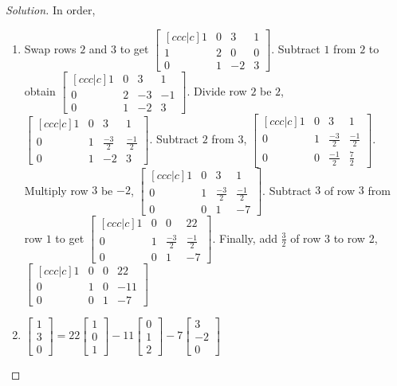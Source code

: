 \documentclass[oneside]{book}
\theoremstyle{definition}
\begin{document}
\begin{proof}[Solution]
In order,
\begin{enumerate}
\item Swap rows $2$ and $3$ to get $\begin{bmatrix}[ccc|c] 1 & 0 & 3 & 1 \\ 1 & 2 & 0 & 0 \\ 0 & 1 & -2 & 3 \end{bmatrix}$. Subtract $1$ from $2$ to obtain $\begin{bmatrix}[ccc|c] 1 & 0 & 3 & 1 \\ 0 & 2 & -3 & -1 \\ 0 & 1 & -2 & 3 \end{bmatrix}$. Divide row $2$ be $2$, $\begin{bmatrix}[ccc|c] 1& 0 & 3 & 1 \\ 0 & 1 & \frac{-3}{2} & \frac{-1}{2} \\ 0 & 1 & -2 & 3\end{bmatrix}$. Subtract $2$ from $3$, $\begin{bmatrix}[ccc|c] 1 & 0 & 3 & 1 \\ 0 & 1 & \frac{-3}{2} & \frac{-1}{2} \\ 0 & 0 & \frac{-1}{2} & \frac{7}{2} \end{bmatrix}$. Multiply row $3$ be $-2$, $\begin{bmatrix}[ccc|c] 1 & 0 & 3 & 1 \\ 0 & 1 & \frac{-3}{2} & \frac{-1}{2} \\ 0 & 0 & 1 & -7 \end{bmatrix}$. Subtract $3$ of row $3$ from row $1$ to get $\begin{bmatrix}[ccc|c] 1 & 0 & 0 & 22 \\ 0 & 1 & \frac{-3}{2} & \frac{-1}{2} \\ 0 & 0 & 1 & -7 \end{bmatrix}$. Finally, add $\frac{3}{2}$ of row $3$ to row 2, $\begin{bmatrix}[ccc|c] 1&0&0& 22 \\ 0&1&0&-11 \\ 0 & 0 & 1 & -7 \end{bmatrix}$
\item $\begin{bmatrix} 1 \\ 3 \\ 0 \end{bmatrix} = 22 \begin{bmatrix} 1 \\ 0 \\ 1 \end{bmatrix} - 11\begin{bmatrix} 0 \\ 1 \\ 2 \end{bmatrix} -7 \begin{bmatrix} 3 \\ -2 \\ 0 \end{bmatrix}$

\end{enumerate}
\end{proof}
\end{document}
